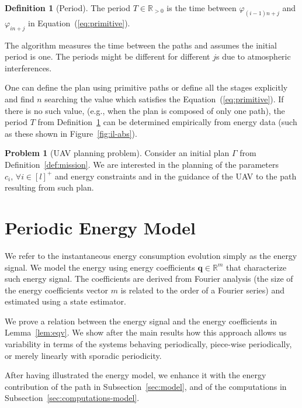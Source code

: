 \documentclass[letterpaper,10pt,conference]{ieeeconf}
\theoremstyle{definition}
\newtheorem{defn}{Definition}[section]
\newtheorem{pb}{Problem}[section]
\begin{document}
\begin{defn}[Period]\label{def:period}
  The period $T\in\mathbb{R}_{> 0}$ is the time between $\varphi_{(i-1)n+j}$ and $\varphi_{in+j}$ in Equation~(\ref{eq:primitive}).
\end{defn} 

The algorithm measures the time between the paths and assumes the initial period is one. The periods might be different for different $j$s due to atmospheric interferences.

One can define the plan using primitive paths or define all the stages explicitly and find $n$ searching the value which satisfies the Equation~(\ref{eq:primitive}). If there is no such value, (e.g., when the plan is composed of only one path), the period $T$ from Definition~\ref{def:period} can be determined empirically from energy data (such as these shown in Figure~\ref{fig:il-abs}).

\begin{pb}[UAV planning problem]\label{pb}
  Consider an initial plan $\Gamma$ from Definition~\ref{def:mission}. We are interested in the planning of the parameters $c_i,\,\forall i\in[l]^+$ and energy constraints and in the guidance of the UAV to the path resulting from such plan.
\end{pb}


\section{Periodic Energy Model}  %
\label{sec:energy-model}         %
We refer to the instantaneous energy consumption evolution simply as the energy signal. We model the energy using energy coefficients $\mathbf{q}\in\mathbb{R}^m$ that characterize such energy signal. The coefficients are derived from Fourier analysis (the size of the energy coefficients vector $m$ is related to the order of a Fourier series) and estimated using a state estimator. %

We prove a relation between the energy signal and the energy coefficients in Lemma~\ref{lem:eqv}. We show after the main results how this approach allows us variability in terms of the systems behaving periodically, piece-wise periodically, or merely linearly with sporadic periodicity.

After having illustrated the energy model, we enhance it with the energy contribution of the path in Subsection~\ref{sec:model}, and of the computations in Subsection~\ref{sec:computations-model}. 
\end{document}
